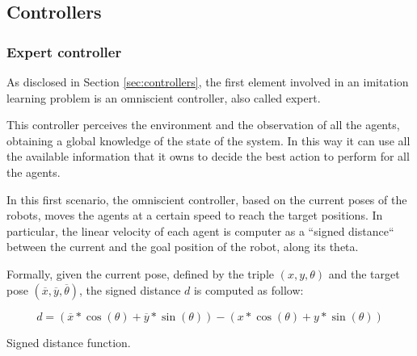 
\subsection{Controllers}
\label{subsec:controllers}

\subsubsection{Expert controller}
\label{subsubsec:omniscient}

As disclosed in Section \ref{sec:controllers}, the first element involved in an 
imitation learning problem is an omniscient controller, also called expert.

This controller perceives the environment and the observation of all the agents, 
obtaining a global knowledge of the state of the system. In this way it can use all 
the available information that it owns to decide the best action to perform for all 
the agents. 

In this first scenario, the omniscient controller, based on the current poses of the 
robots, moves the agents at a certain speed to reach the target positions. In 
particular, the linear velocity of each agent is computer as a ``signed distance`` 
between the current and the goal position of the robot, along its theta. 

Formally, given the current pose, defined by the triple $(x, y, \theta)$ and the 
target pose $(\overline x, \overline y, \overline \theta)$, the signed distance $d$ 
is computed as follow:
\begin{Equation}[!htb]
	\centering
	\begin{equation}
	d = \left(\overline x * \cos (\theta) + \overline y * \sin (\theta)\right) -
	\left( x * \cos (\theta) + y * \sin (\theta)\right)
	\end{equation}
	\caption[Signed distance.]{Signed distance function.}
	\label{eq:signeddist}
\end{Equation}

